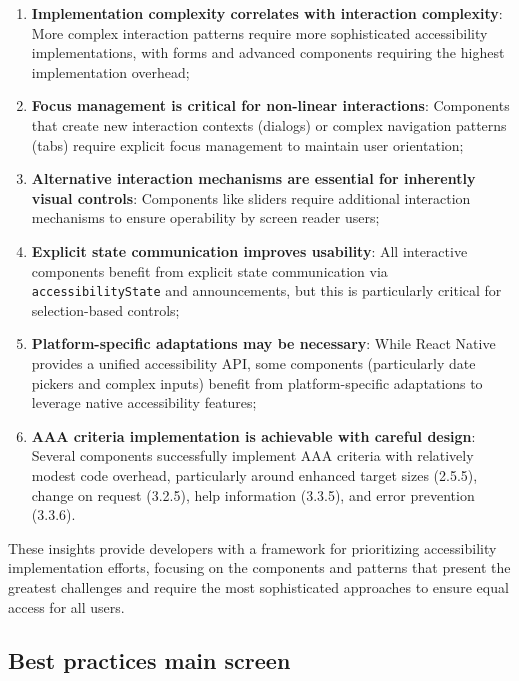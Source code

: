 \begin{enumerate}
    \item \textbf{Implementation complexity correlates with interaction complexity}: More complex interaction patterns require more sophisticated accessibility implementations, with forms and advanced components requiring the highest implementation overhead;
    
    \item \textbf{Focus management is critical for non-linear interactions}: Components that create new interaction contexts (dialogs) or complex navigation patterns (tabs) require explicit focus management to maintain user orientation;
    
    \item \textbf{Alternative interaction mechanisms are essential for inherently visual controls}: Components like sliders require additional interaction mechanisms to ensure operability by screen reader users;
    
    \item \textbf{Explicit state communication improves usability}: All interactive components benefit from explicit state communication via \texttt{accessibilityState} and announcements, but this is particularly critical for selection-based controls;
    
    \item \textbf{Platform-specific adaptations may be necessary}: While React Native provides a unified accessibility API, some components (particularly date pickers and complex inputs) benefit from platform-specific adaptations to leverage native accessibility features;
    
    \item \textbf{AAA criteria implementation is achievable with careful design}: Several components successfully implement AAA criteria with relatively modest code overhead, particularly around enhanced target sizes (2.5.5), change on request (3.2.5), help information (3.3.5), and error prevention (3.3.6).
\end{enumerate}

These insights provide developers with a framework for prioritizing accessibility implementation efforts, focusing on the components and patterns that present the greatest challenges and require the most sophisticated approaches to ensure equal access for all users.

\subsection{Best practices main screen}

